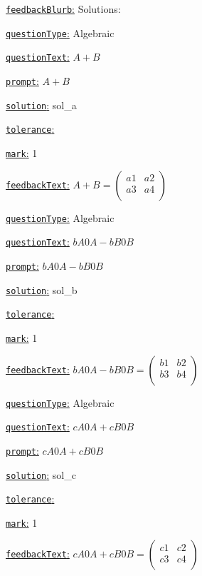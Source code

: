 \documentclass[preview]{standalone}
\newcommand \fieldname[1]{\underline{\texttt{#1}:}}
\begin{document}
\fieldname{feedbackBlurb}
Solutions:

\fieldname{questionType}
Algebraic

\fieldname{questionText}
$A+B$

\fieldname{prompt}
$A+B$

\fieldname{solution}
sol_a

\fieldname{tolerance}


\fieldname{mark}
1

\fieldname{feedbackText}
$A+B = \left( {\begin{array}{cc}
    {a1} & {a2} \\
    {a3} & {a4} \\
 \end{array} } \right) $

\fieldname{questionType}
Algebraic

\fieldname{questionText}
${bA0}A-{bB0}B$

\fieldname{prompt}
${bA0}A-{bB0}B$

\fieldname{solution}
sol_b

\fieldname{tolerance}


\fieldname{mark}
1

\fieldname{feedbackText}
${bA0}A-{bB0}B = \left( {\begin{array}{cc}
   {b1} & {b2} \\
   {b3} & {b4} \\
 \end{array} } \right) $

\fieldname{questionType}
Algebraic

\fieldname{questionText}
${cA0}A+{cB0}B$

\fieldname{prompt}
${cA0}A+{cB0}B$

\fieldname{solution}
sol_c

\fieldname{tolerance}


\fieldname{mark}
1

\fieldname{feedbackText}
${cA0}A+{cB0}B = \left( {\begin{array}{cc}
   {c1} & {c2} \\
   {c3} & {c4} \\
 \end{array} } \right) $
\end{document}
